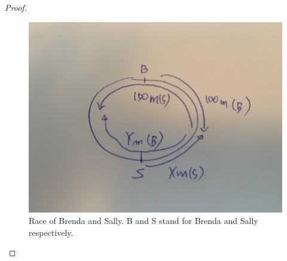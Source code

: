 \documentclass{article}
\begin{document}
\begin{itemize}
\begin{proof}
\begin{figure}
\begin{center}
\includegraphics[width=.5\linewidth]{figures/sally_and_brenda}
\caption{Race of Brenda and Sally. B and S stand for Brenda and Sally respectively.}
\label{fig:race}
\end{center}
\end{figure}

\end{proof}


\end{itemize}
\end{document}
